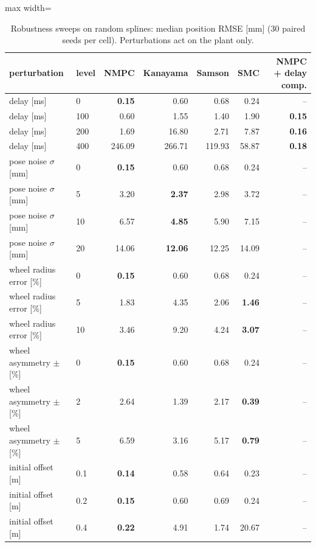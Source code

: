 \begin{table}[!htbp]
\centering\small
\caption{Robustness sweeps on random splines: median position RMSE [mm] (30 paired seeds per cell). Perturbations act on the plant only.}\label{tab:robustness}
\begin{adjustbox}{max width=\linewidth}
\begin{tabular}{llrrrrr}
\toprule
perturbation & level & NMPC & Kanayama & Samson & SMC & NMPC + delay comp. \\
\midrule
delay [ms] & 0 & \textbf{0.15} & 0.60 & 0.68 & 0.24 & -- \\
delay [ms] & 100 & 0.60 & 1.55 & 1.40 & 1.90 & \textbf{0.15} \\
delay [ms] & 200 & 1.69 & 16.80 & 2.71 & 7.87 & \textbf{0.16} \\
delay [ms] & 400 & 246.09 & 266.71 & 119.93 & 58.87 & \textbf{0.18} \\
pose noise $\sigma$ [mm] & 0 & \textbf{0.15} & 0.60 & 0.68 & 0.24 & -- \\
pose noise $\sigma$ [mm] & 5 & 3.20 & \textbf{2.37} & 2.98 & 3.72 & -- \\
pose noise $\sigma$ [mm] & 10 & 6.57 & \textbf{4.85} & 5.90 & 7.15 & -- \\
pose noise $\sigma$ [mm] & 20 & 14.06 & \textbf{12.06} & 12.25 & 14.09 & -- \\
wheel radius error [\%] & 0 & \textbf{0.15} & 0.60 & 0.68 & 0.24 & -- \\
wheel radius error [\%] & 5 & 1.83 & 4.35 & 2.06 & \textbf{1.46} & -- \\
wheel radius error [\%] & 10 & 3.46 & 9.20 & 4.24 & \textbf{3.07} & -- \\
wheel asymmetry $\pm$[\%] & 0 & \textbf{0.15} & 0.60 & 0.68 & 0.24 & -- \\
wheel asymmetry $\pm$[\%] & 2 & 2.64 & 1.39 & 2.17 & \textbf{0.39} & -- \\
wheel asymmetry $\pm$[\%] & 5 & 6.59 & 3.16 & 5.17 & \textbf{0.79} & -- \\
initial offset [m] & 0.1 & \textbf{0.14} & 0.58 & 0.64 & 0.23 & -- \\
initial offset [m] & 0.2 & \textbf{0.15} & 0.60 & 0.69 & 0.24 & -- \\
initial offset [m] & 0.4 & \textbf{0.22} & 4.91 & 1.74 & 20.67 & -- \\
\bottomrule
\end{tabular}
\end{adjustbox}
\end{table}
